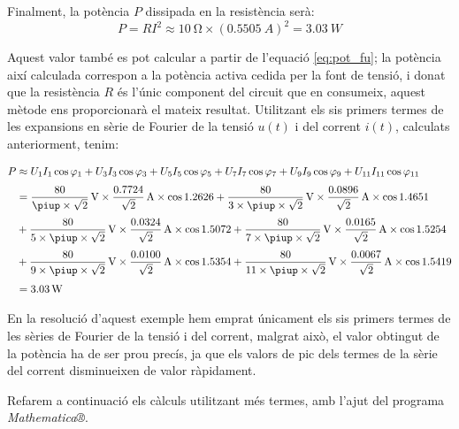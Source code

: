 \begin{exemple}
    Finalment, la potència $P$ dissipada en la resistència serà:
    \[
        P = R I^2 \approx \qty{10}{\ohm} \times (\qty{0,5505}{A})^2 =
        \qty{3,03}{W}
    \]

    Aquest valor també es pot calcular a partir de l'equació
    \eqref{eq:pot_fu}; la potència així calculada correspon a la
    potència activa cedida per la font de tensió, i donat que la
    resistència $R$ és l'únic component del circuit que en consumeix,
    aquest mètode ens proporcionarà el mateix resultat. Utilitzant els sis primers termes  de les
    expansions en sèrie de Fourier de la tensió $u(t)$ i del corrent
    $i(t)$, calculats anteriorment, tenim:

    \[\begin{split}
        P &\approx U_1 I_1 \cos\varphi_1 +  U_3 I_3 \cos\varphi_3 +
         U_5 I_5 \cos\varphi_5 + U_7 I_7 \cos\varphi_7 +
         U_9 I_9 \cos\varphi_9 + U_{11} I_{11} \cos\varphi_{11} \\[0.7ex]
        &= \frac{80}{\piup\times\sqrt{2}}\unit{\,V} \times
        \frac{\num{0,7724}}{\sqrt{2}}\unit{\,A} \times \cos \num{1,2626} +
        \frac{80}{3\times\piup\times\sqrt{2}}\unit{\,V} \times
        \frac{\num{0,0896}}{\sqrt{2}}\unit{\,A} \times \cos \num{1,4651}  \\[0.7ex]
        &+ \frac{80}{5\times\piup\times\sqrt{2}}\unit{\,V} \times
        \frac{\num{0,0324}}{\sqrt{2}}\unit{\,A} \times \cos \num{1,5072} +
        \frac{80}{7\times\piup\times\sqrt{2}}\unit{\,V} \times
        \frac{\num{0,0165}}{\sqrt{2}}\unit{\,A} \times \cos \num{1,5254} \\[0.7ex]
        &+ \frac{80}{9\times\piup\times\sqrt{2}}\unit{\,V} \times
        \frac{\num{0,0100}}{\sqrt{2}}\unit{\,A} \times \cos \num{1,5354} +
        \frac{80}{11\times\piup\times\sqrt{2}}\unit{\,V} \times
        \frac{\num{0,0067}}{\sqrt{2}}\unit{\,A} \times \cos \num{1,5419}\\[0.7ex]
        &= \qty{3,03}{W}
    \end{split}\]

    En la resolució d'aquest exemple hem emprat únicament els sis
    primers termes de les sèries de Fourier de la tensió i del corrent,
    malgrat això, el valor  obtingut de la potència ha de ser prou precís, ja que
    els valors de pic dels termes de la sèrie del corrent disminueixen de
    valor ràpidament.

    Refarem a continuació els càlculs utilitzant més termes, amb l'ajut
    del programa
    \emph{Mathematica®}.   


\end{exemple}
